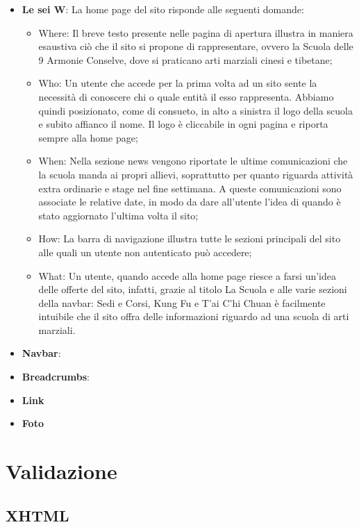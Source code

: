 \documentclass[12pt]{article}
\begin{document}
\begin{itemize}
\item \textbf{Le sei W}: La home page del sito risponde alle seguenti domande:

\begin{itemize}
\item Where: Il breve testo presente nelle pagina di apertura illustra in maniera esaustiva ciò che il sito si propone di rappresentare, ovvero la Scuola delle 9 Armonie Conselve, dove si praticano arti marziali cinesi e tibetane;
\item Who: Un utente che accede per la prima volta ad un sito sente la necessità di conoscere chi o quale entità il esso rappresenta. Abbiamo quindi posizionato, come di consueto, in alto a sinistra il logo della scuola e subito affianco il nome. Il logo è cliccabile in ogni pagina e riporta sempre alla home page;
\item When: Nella sezione news vengono riportate le ultime comunicazioni che la scuola manda ai propri allievi, soprattutto per quanto riguarda attività extra ordinarie e stage nel fine settimana. A queste comunicazioni sono associate le relative date, in modo da dare all’utente l’idea di quando è stato aggiornato l’ultima volta il sito;
\item How: La barra di navigazione illustra tutte le sezioni principali del sito alle quali un utente non autenticato può accedere;
\item What: Un utente, quando accede alla home page riesce a farsi un’idea delle offerte del sito, infatti, grazie al titolo La Scuola e alle varie sezioni della navbar: Sedi e Corsi, Kung Fu e T’ai C’hi Chuan è facilmente intuibile che il sito offra delle informazioni riguardo ad una scuola di arti marziali.
\end{itemize}

\item \textbf{Navbar}:

\item \textbf{Breadcrumbs}:

\item \textbf{Link}

\item \textbf{Foto}


\end{itemize}

		
\section{Validazione}
	\subsection{XHTML}
\end{document}
